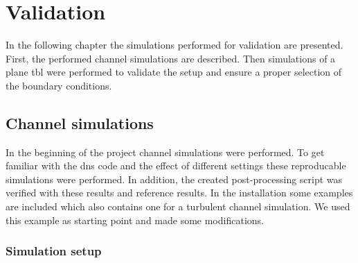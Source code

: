 \chapter{Validation} \label{chap:validation}


In the following chapter the simulations performed for validation are presented.
First, the performed channel simulations are described.
Then simulations of a plane \acrshort{tbl} were performed to validate the setup and ensure a proper selection of the boundary conditions.

\section{Channel simulations}\label{sec:channel}
In the beginning of the project channel simulations were performed. 
To get familiar with the \acrshort{dns} code and the effect of different settings these reproducable simulations were performed.
In addition, the created post-processing script was verified with these results and reference results.
In the  installation some examples are included which also contains one for a turbulent channel simulation.
We used this example as starting point and made some modifications.

\subsection{Simulation setup} \label{subsec:channelSetup}


